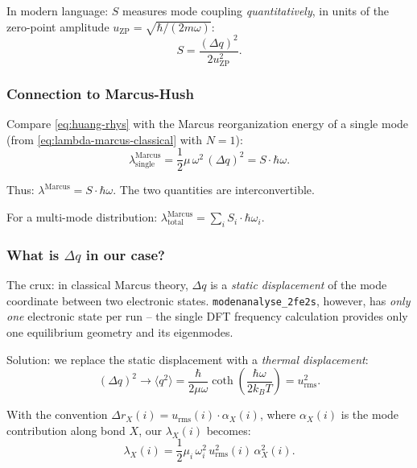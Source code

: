\documentclass[11pt,a4paper,twoside]{article}
\theoremstyle{remark}
\begin{document}
In modern language: $S$ measures mode coupling
\emph{quantitatively}, in units of the zero-point amplitude
$u_\text{ZP} = \sqrt{\hbar/(2m\omega)}$:
\begin{equation}
  S = \frac{(\Delta q)^2}{2 u_\text{ZP}^2}.
  \label{eq:huang-rhys-units}
\end{equation}

\subsubsection*{Connection to Marcus-Hush}

Compare \eqref{eq:huang-rhys} with the Marcus reorganization
energy of a single mode (from
\eqref{eq:lambda-marcus-classical} with $N=1$):
\begin{equation}
  \lambda^\text{Marcus}_\text{single}
  = \frac{1}{2}\mu\,\omega^2\,(\Delta q)^2
  = S \cdot \hbar\omega.
  \label{eq:lambda-vs-S}
\end{equation}

Thus: \textbf{$\lambda^\text{Marcus} = S \cdot \hbar\omega$}.
The two quantities are interconvertible.

For a multi-mode distribution:
$\lambda^\text{Marcus}_\text{total} = \sum_i S_i \cdot \hbar\omega_i$.

\subsubsection*{What is $\Delta q$ in our case?}

The crux: in classical Marcus theory, $\Delta q$ is a
\emph{static displacement} of the mode coordinate between two
electronic states. \texttt{modenanalyse\_2fe2s}, however, has
\emph{only one} electronic state per run -- the single DFT
frequency calculation provides only one equilibrium geometry and
its eigenmodes.

Solution: we replace the static displacement with a \emph{thermal
displacement}:
\begin{equation}
  (\Delta q)^2 \to \langle q^2 \rangle = \frac{\hbar}{2\mu\omega}
  \coth\!\left(\frac{\hbar\omega}{2k_BT}\right)
  = u_\text{rms}^2.
  \label{eq:thermal-replacement}
\end{equation}

With the convention
$\Delta r_X(i) = u_\text{rms}(i) \cdot \alpha_X(i)$, where
$\alpha_X(i)$ is the mode contribution along bond $X$, our
$\lambda_X(i)$ becomes:
\begin{equation}
  \lambda_X(i) = \frac{1}{2}\mu_i\,\omega_i^2\,
                  u_\text{rms}^2(i)\,\alpha_X^2(i).
\end{equation}
\end{document}
